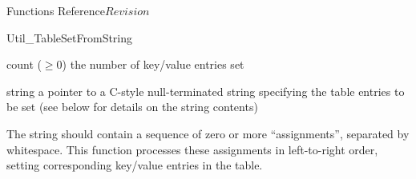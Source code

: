 \begin{cactuspart}{ Functions Reference}{}{$Revision$}
\begin{FunctionDescription}{Util\_TableSetFromString}
\begin{ResultSection}
\begin{Result}{count ($\ge 0$)}
the number of key/value entries set
\end{Result}
\end{ResultSection}

\begin{ParameterSection}
\begin{Parameter}{string}
a pointer to a C-style null-terminated string specifying the table
entries to be set (see below for details on the string contents)
\end{Parameter}
\end{ParameterSection}

\begin{Discussion}
The string should contain a sequence of zero or more 
``assignments'', separated by whitespace.  This function processes
these assignments in left-to-right order, setting corresponding key/value
entries in the table.


\end{Discussion}
\end{FunctionDescription}
\end{cactuspart}
